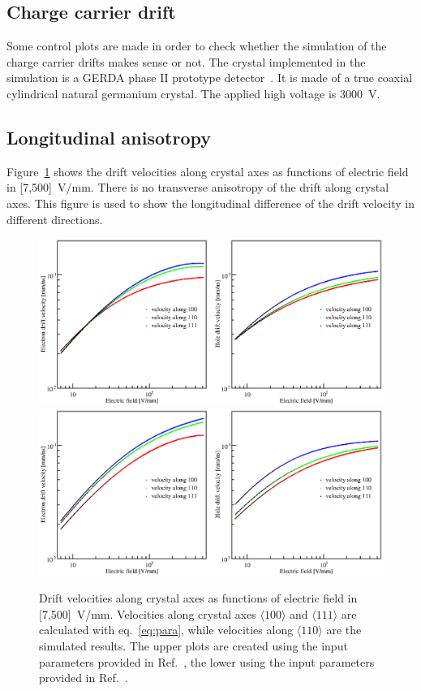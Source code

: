 \subsection{Charge carrier drift}
\label{subsec:drift}
Some control plots are made in order to check whether the simulation of the charge carrier drifts makes sense or not. The crystal implemented in the simulation is a GERDA phase II prototype detector~\cite{Siegfried}. It is made of a true coaxial cylindrical natural germanium crystal. The applied high voltage is 3000~V.

\subsection{Longitudinal anisotropy}
\label{subsec:long}
Figure~\ref{fig:vvse} shows the drift velocities along crystal axes as functions of electric field in [7,500]~V/mm. There is no transverse anisotropy of the drift along crystal axes. This figure is used to show the longitudinal difference of the drift velocity in different directions. 
\begin{figure}[tbhp]
  \centering
  \includegraphics[width=1.0\textwidth]{VvsElucian} \\\hfil
  \includegraphics[width=1.0\textwidth]{VvsEbart}
  \caption{Drift velocities along crystal axes as functions of electric field in [7,500]~V/mm. Velocities along crystal axes $\langle 100 \rangle$ and $\langle 111 \rangle$ are calculated with eq.~\ref{eq:para}, while velocities along $\langle 110 \rangle$ are the simulated results. The upper plots are created using the input parameters provided in Ref.~\cite{miha}, the lower using the input parameters provided in Ref.~\cite{bart}.}
  \label{fig:vvse}
\end{figure}

